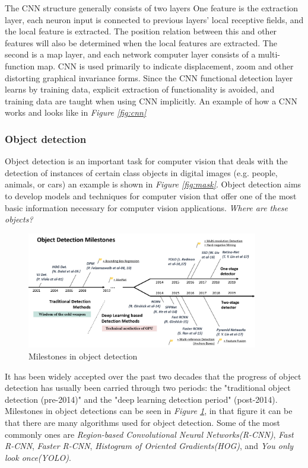The CNN structure generally consists of two layers One feature is the extraction layer, each neuron input is connected to previous layers' local receptive fields, and the local feature is extracted. 
The position relation between this and other features will also be determined when the local features are extracted. The second is a map layer, and each network computer layer consists of a multi-function map. 
CNN is used primarily to indicate displacement, zoom and other distorting graphical invariance forms. 
Since the CNN functional detection layer learns by training data, explicit extraction of functionality is avoided, and training data are taught when using CNN implicitly\cite{liu_implementation_2015}. An example of how a CNN works and looks like in \textit{Figure \ref{fig:cnn}}




\subsubsection*{Object detection}
Object detection is an important task for computer vision that deals with the detection of instances of certain class objects in digital images (e.g. people, animals, or cars) an example is shown in \textit{Figure \ref{fig:mask}}. Object detection aims to develop models and techniques for computer vision that offer one of the most basic information necessary for computer vision applications\cite{zou_object_2019}. \textit{Where are these objects?}

\begin{figure}[h]
    \centering
    \includegraphics[width=0.9\textwidth]{graphics/objectdetection.png}
    \caption{Milestones in object detection \cite{zou_object_2019}}
    \label{fig:milestones}
\end{figure}
It has been widely accepted over the past two decades that the progress of object detection has usually been carried through two periods: the "traditional object detection (pre-2014)" and the "deep learning detection period" (post-2014). Milestones in object detections can be seen in \textit{Figure \ref{fig:milestones}}, in that figure it can be that there are many algorithms used for object detection. Some of the most commonly ones are \textit{Region-based Convolutional Neural Networks(R-CNN)}\cite{girshick_region-based_2016}, \textit{Fast R-CNN}\cite{girshick_fast_2015}, \textit{Faster R-CNN}\cite{ren_faster_2016}, \textit{Histogram of Oriented Gradients(HOG)}\cite{dalal_histograms_2005}, and \textit{You only look once(YOLO)}\cite{redmon_you_2016}.
\clearpage

